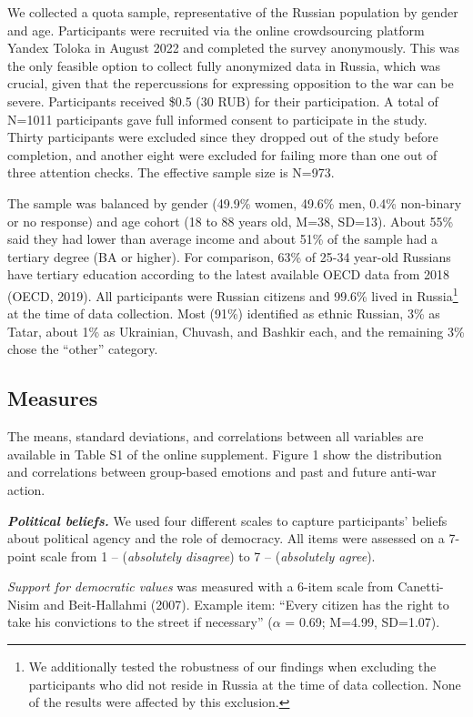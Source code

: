 \documentclass[
]{article}
\begin{document}
We collected a quota sample, representative of the Russian population by gender and age. Participants were recruited via the online crowdsourcing platform Yandex Toloka in August 2022 and completed the survey anonymously. This was the only feasible option to collect fully anonymized data in Russia, which was crucial, given that the repercussions for expressing opposition to the war can be severe. Participants received \$0.5 (30 RUB) for their participation. A total of N=1011 participants gave full informed consent to participate in the study. Thirty participants were excluded since they dropped out of the study before completion, and another eight were excluded for failing more than one out of three attention checks. The effective sample size is N=973.

The sample was balanced by gender (49.9\% women, 49.6\% men, 0.4\% non-binary or no response) and age cohort (18 to 88 years old, M=38, SD=13). About 55\% said they had lower than average income and about 51\% of the sample had a tertiary degree (BA or higher). For comparison, 63\% of 25-34 year-old Russians have tertiary education according to the latest available OECD data from 2018 (OECD, 2019). All participants were Russian citizens and 99.6\% lived in Russia\footnote{We additionally tested the robustness of our findings when excluding the participants who did not reside in Russia at the time of data collection. None of the results were affected by this exclusion.} at the time of data collection. Most (91\%) identified as ethnic Russian, 3\% as Tatar, about 1\% as Ukrainian, Chuvash, and Bashkir each, and the remaining 3\% chose the ``other'' category.

\subsection*{Measures}\label{measures}

The means, standard deviations, and correlations between all variables are available in Table S1 of the online supplement. Figure 1 show the distribution and correlations between group-based emotions and past and future anti-war action.

\textbf{\emph{Political beliefs.}} We used four different scales to capture participants' beliefs about political agency and the role of democracy. All items were assessed on a 7-point scale from 1 -- (\emph{absolutely disagree}) to 7 -- (\emph{absolutely agree}).

\emph{Support for democratic values} was measured with a 6-item scale from Canetti-Nisim and Beit-Hallahmi (2007). Example item: ``Every citizen has the right to take his convictions to the street if necessary'' (\(\alpha\) = 0.69; M=4.99, SD=1.07).
\end{document}
